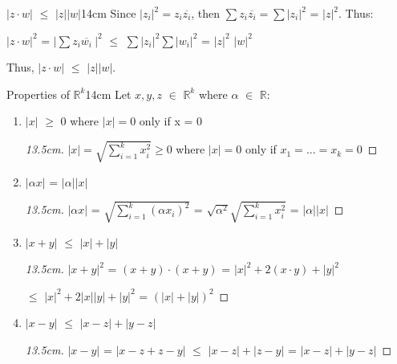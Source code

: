 	\vspace{0.5cm}
	
	\begin{corollary}{$|z \cdot w|$ $\leq$ $|z| |w|$}{14cm}
		Since $|z_i|^2 = z_i\overline{z_i}$, then
		$\sum z_i\overline{z_i} = \sum |z_i|^2$ = $|z|^2$. Thus:

		\hspace{1cm}
		$|z \cdot w|^2$ = $|\sum z_i\overline{w_i} \ |^2$
		$\leq$ $\sum |z_i|^2 \sum |w_i|^2$ = $|z|^2$ $|w|^2$

		Thus, $|z \cdot w|$ $\leq$ $|z| |w|$.
	\end{corollary}

	\newpage



	\begin{wtheorem}{Properties of $\mathbb{R}^k$}{14cm}
		Let $x,y,z$ $\in$ $\mathbb{R}^k$ where $\alpha$ $\in$ $\mathbb{R}$:
	\end{wtheorem}
	
	\begin{enumerate}[label=(\alph*), leftmargin=2cm, itemsep=0.1cm]
		\item $|x|$ $\geq$ 0 where $|x| = 0$ only if x = 0

			\begin{proof}[13.5cm]
				$|x| = \sqrt{\sum_{i=1}^{k} x_i^2} \geq 0$ where $|x| = 0$
				only if $x_1 = ... = x_k = 0$
			\end{proof}

		\item $|\alpha x|$ = $|\alpha| |x|$
		
			\begin{proof}[13.5cm]
				$|\alpha x|$ = $\sqrt{\sum_{i=1}^k (\alpha x_i)^2}$
				= $\sqrt{\alpha^2} \sqrt{\sum_{i=1}^k x_i^2}$ = $|\alpha| |x|$
			\end{proof}
	
		\item $|x+y|$ $\leq$ $|x| + |y|$
		
			\begin{proof}[13.5cm]
				$|x+y|^2$ = $(x+y) \cdot (x+y)$ = $|x|^2 + 2(x \cdot y) + |y|^2$

				$\leq$ $|x|^2 + 2|x||y| + |y|^2$ = $(|x|+|y|)^2$
			\end{proof}

		\item $|x-y|$ $\leq$ $|x-z| + |y-z|$
		
			\begin{proof}[13.5cm]
				$|x-y|$ = $|x-z + z-y|$ $\leq$ $|x-z| + |z-y|$ = $|x-z| + |y-z|$
			\end{proof}
	\end{enumerate}



